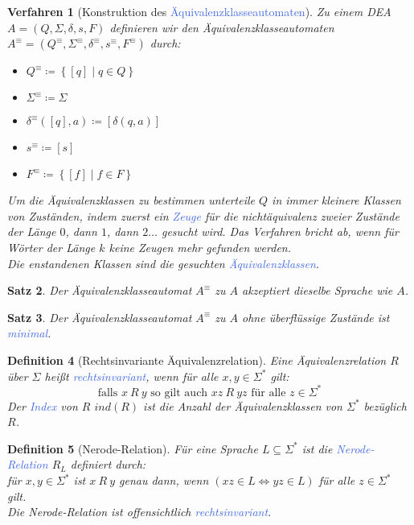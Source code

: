 \documentclass[11pt]{article}
\newcommand{\tcol}[1]{\textcolor{RoyalBlue}{#1}}
\newcommand{\set}[1]{\left\lbrace #1\right\rbrace}
\theoremstyle{break}
\newtheorem{satz}{Satz}[section]
\newtheorem{defi}[satz]{Definition}
\newtheorem{verf}[satz]{Verfahren}
\begin{document}
\begin{verf}[Konstruktion des \tcol{Äquivalenzklasseautomaten}]
Zu einem DEA $A=(Q,\Sigma,\delta ,s,F)$ definieren wir den Äquivalenzklasseautomaten $A^\equiv=(Q^\equiv ,\Sigma^\equiv ,\delta^\equiv ,s^\equiv ,F^\equiv)$ durch:
\begin{itemize}
\item $Q^\equiv\coloneqq\set{[q]\mid q\in Q}$
\item $\Sigma^\equiv\coloneqq\Sigma$
\item $\delta^\equiv([q],a)\coloneqq[\delta(q,a)]$
\item $s^\equiv\coloneqq[s]$
\item $F^\equiv\coloneqq\set{[f]\mid f\in F}$
\end{itemize}
Um die Äquivalenzklassen zu bestimmen unterteile $Q$ in immer kleinere Klassen von Zuständen, indem zuerst ein \tcol{Zeuge} für die nichtäquivalenz zweier Zustände der Länge $0$, dann $1$, dann $2\dots$ gesucht wird. Das Verfahren bricht ab, wenn für Wörter der Länge $k$ keine Zeugen mehr gefunden werden.\\
Die enstandenen Klassen sind die gesuchten \tcol{Äquivalenzklassen}.
\end{verf}

\begin{satz}
Der Äquivalenzklasseautomat $A^\equiv$ zu $A$ akzeptiert dieselbe Sprache wie $A$.
\end{satz}

\begin{satz}
Der Äquivalenzklasseautomat $A^\equiv$ zu $A$ ohne überflüssige Zustände ist \tcol{minimal}.
\end{satz}

\begin{defi}[Rechtsinvariante Äquivalenzrelation]
Eine Äquivalenzrelation $R$ über $\Sigma$ heißt \tcol{rechtsinvariant}, wenn für alle $x,y\in\Sigma^*$ gilt:
\[\text{falls } x\ R\ y\text{ so gilt auch }xz\ R\ yz\text{ für alle } z\in\Sigma^*\]
Der \tcol{Index} von $R$ $ind(R)$ ist die Anzahl der Äquivalenzklassen von $\Sigma^*$ bezüglich $R$.
\end{defi}

\begin{defi}[Nerode-Relation]
Für eine Sprache $L\subseteq\Sigma^*$ ist die \tcol{Nerode-Relation} $R_L$ definiert durch:\\
für $x,y\in\Sigma^*$ ist $x\ R\ y$ genau dann, wenn $(xz\in L\Leftrightarrow yz\in L)$ für alle $z\in\Sigma^*$ gilt.\\
Die Nerode-Relation ist offensichtlich \tcol{rechtsinvariant}.
\end{defi} 
\end{document}
